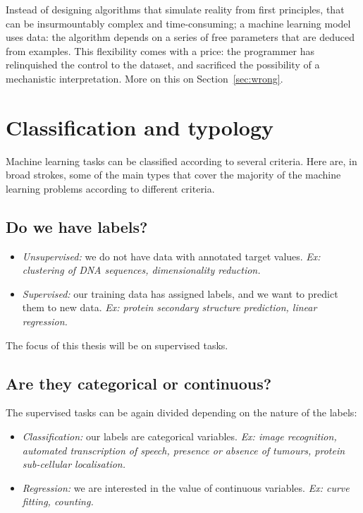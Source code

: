 Instead of designing algorithms that simulate reality from first principles, that can be insurmountably complex and time-consuming; a machine learning model uses data: the algorithm depends on a series of free parameters that are deduced from examples.
This flexibility comes with a price: the programmer has relinquished the control to the dataset, and sacrificed the possibility of a mechanistic interpretation.
More on this on Section~\ref{sec:wrong}.

\section{Classification and typology}
Machine learning tasks can be classified according to several criteria.
Here are, in broad strokes, some of the main types that cover the majority of the machine learning problems according to different criteria.

\subsection{Do we have labels?}
\begin{itemize}
\item \emph{Unsupervised:} we do not have data with annotated target values. \emph{Ex: clustering of DNA sequences, dimensionality reduction.}
\item \emph{Supervised:} our training data has assigned labels, and we want to predict them to new data. \emph{Ex: protein secondary structure prediction, linear regression.}
\end{itemize}

The focus of this thesis will be on supervised tasks.

\subsection[Categorical or continuous?]{Are they categorical or continuous?}
The supervised tasks can be again divided depending on the nature of the labels:
\begin{itemize}
\item \emph{Classification:} our labels are categorical variables. \emph{Ex: image recognition, automated transcription of speech, presence or absence of tumours, protein sub-cellular localisation.}
\item \emph{Regression:} we are interested in the value of continuous variables. \emph{Ex: curve fitting, counting.}
\end{itemize}

